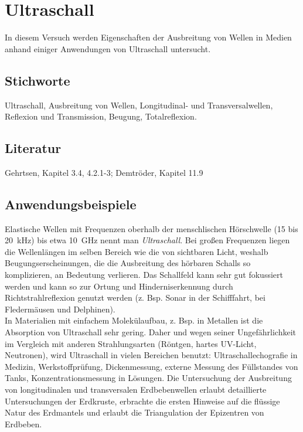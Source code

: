 \chapter{Ultraschall}
\label{vn:2}

In diesem Versuch werden Eigenschaften der Ausbreitung von Wellen in Medien anhand einiger Anwendungen von Ultraschall untersucht.
%
\section{Stichworte}
Ultraschall, Ausbreitung von Wellen, Longitudinal- und Transversalwellen, Reflexion und Transmission, Beugung, Totalreflexion.
%
\section{Literatur}
Gehrtsen, Kapitel 3.4, 4.2.1-3; Demtröder, Kapitel 11.9
%
\section{Anwendungsbeispiele}
%
Elastische Wellen mit Frequenzen oberhalb der menschlischen Hörschwelle (15 bis 20~kHz) bis etwa 10~GHz nennt man \textit{Ultraschall}. Bei großen Frequenzen liegen die Wellenlängen im selben Bereich wie die von sichtbaren Licht, weshalb Beugungserscheinungen, die die Ausbreitung des hörbaren Schalls so komplizieren, an Bedeutung verlieren. Das Schallfeld kann sehr gut fokussiert werden und kann so zur Ortung und Hinderniserkennung durch Richtstrahlreflexion genutzt werden (z. Bsp. Sonar in der Schifffahrt, bei Fledermäusen und Delphinen). \\
In Materialien mit einfachem Molekülaufbau, z. Bsp. in Metallen ist die Absorption von Ultraschall sehr gering. Daher und wegen seiner Ungefährlichkeit im Vergleich mit anderen Strahlungsarten (Röntgen, hartes UV-Licht, Neutronen), wird Ultraschall in vielen Bereichen benutzt: Ultraschallechografie in Medizin, Werkstoffprüfung, Dickenmessung, externe Messung des Füllstandes von Tanks, Konzentrationsmessung in Lösungen. Die Untersuchung der Ausbreitung von longitudinalen und transversalen Erdbebenwellen erlaubt detaillierte Untersuchungen der Erdkruste, erbrachte die ersten Hinweise auf die flüssige Natur des Erdmantels und erlaubt die Triangulation der Epizentren von Erdbeben.
%

